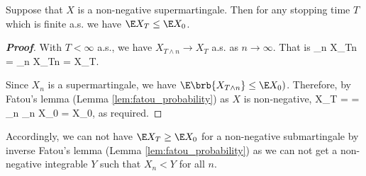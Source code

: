 \begin{proposition}
Suppose that $X$ is a non-negative supermartingale. Then for any stopping time $T$ which is finite a.s. we have $\E X_T \leq \E X_0$.
\end{proposition}

\begin{proof}[\bf Proof]
With $T<\infty$ a.s., we have $X_{T\land n} \to X_T$ a.s. as $n\to \infty$. That is
\be
\liminf_n X_{T\land n} = \lim_{n\to \infty} X_{T\land n} = X_T.
\ee

Since $X_n$ is a supermartingale, we have $\E\brb{X_{T\land n}} \leq \E X_0)$. Therefore, by Fatou's lemma (Lemma \ref{lem:fatou_probability}) as $X$ is non-negative,
\be
\E X_T = \E{} = \E{} \leq \liminf_n \E{} \leq \liminf_n \E X_0 = \E X_0,
\ee
as required.
\end{proof}

\begin{remark}
Accordingly, we can not have $\E X_T \geq \E X_0$ for a non-negative submartingale by inverse Fatou's lemma (Lemma \ref{lem:fatou_probability}) as we can not get a non-negative integrable $Y$ such that $X_n<Y$ for all $n$.
\end{remark}

